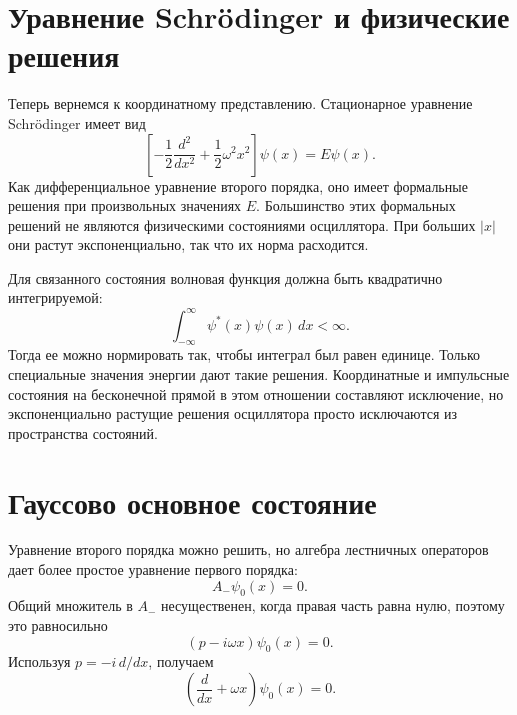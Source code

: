 \begin{classroomqa}
\end{classroomqa}

\section{Уравнение Schr\"odinger и физические решения}

Теперь вернемся к координатному представлению. Стационарное уравнение Schr\"odinger имеет вид
\begin{equation}
\left[
-\frac12\frac{d^{2}}{dx^{2}}
+\frac12\omega^{2}x^{2}
\right]\psi(x)=E\psi(x).
\end{equation}
Как дифференциальное уравнение второго порядка, оно имеет формальные решения при произвольных значениях \(E\). Большинство этих формальных решений не являются физическими состояниями осциллятора. При больших \(\lvert x\rvert\) они растут экспоненциально, так что их норма расходится.

Для связанного состояния волновая функция должна быть квадратично интегрируемой:
\begin{equation}
\int_{-\infty}^{\infty}\psi^{*}(x)\psi(x)\,dx<\infty.
\end{equation}
Тогда ее можно нормировать так, чтобы интеграл был равен единице. Только специальные значения энергии дают такие решения. Координатные и импульсные состояния на бесконечной прямой в этом отношении составляют исключение, но экспоненциально растущие решения осциллятора просто исключаются из пространства состояний.

\section{Гауссово основное состояние}

Уравнение второго порядка можно решить, но алгебра лестничных операторов дает более простое уравнение первого порядка:
\begin{equation}
A_{-}\psi_{0}(x)=0.
\end{equation}
Общий множитель в \(A_{-}\) несущественен, когда правая часть равна нулю, поэтому это равносильно
\begin{equation}
(p-i\omega x)\psi_{0}(x)=0.
\end{equation}
Используя \(p=-i\,d/dx\), получаем
\begin{equation}
\left(\frac{d}{dx}+\omega x\right)\psi_{0}(x)=0.
\end{equation}

